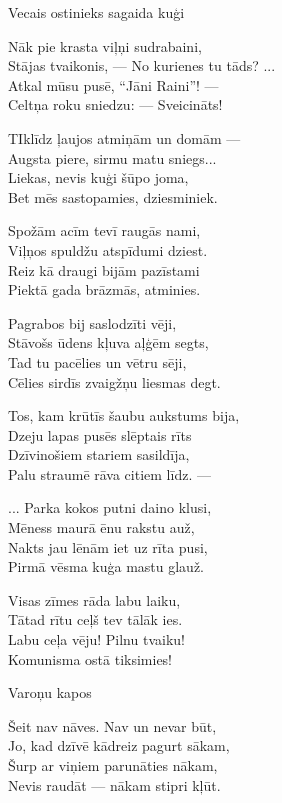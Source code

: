 \documentclass[14pt]{extarticle}
\begin{document}
{\newpage

{\large \sc Vecais ostinieks sagaida kuģi}

Nāk pie krasta viļņi sudrabaini,\\
Stājas tvaikonis, --- No kurienes tu tāds? ...\\
Atkal mūsu pusē, ``Jāni Raini''! ---\\
Celtņa roku sniedzu: --- Sveicināts!

TIklīdz ļaujos atmiņām un domām ---\\
Augsta piere, sirmu matu sniegs...\\
Liekas, nevis kuģi šūpo joma, \\
Bet mēs sastopamies, dziesminiek.

Spožām acīm tevī raugās nami,\\
Viļņos spuldžu atspīdumi dziest.\\
Reiz kā draugi bijām pazīstami\\
Piektā gada brāzmās, atminies.

Pagrabos bij saslodzīti vēji,\\
Stāvošs ūdens kļuva aļģēm segts,\\
Tad tu pacēlies un vētru sēji,\\
Cēlies sirdīs zvaigžņu liesmas degt.

Tos, kam krūtīs šaubu aukstums bija,\\
Dzeju lapas pusēs slēptais rīts\\
Dzīvinošiem stariem sasildīja,\\
Palu straumē rāva citiem līdz. ---

... Parka kokos putni daino klusi,\\
Mēness maurā ēnu rakstu auž,\\
Nakts jau lēnām iet uz rīta pusi,\\
Pirmā vēsma kuģa mastu glauž.

Visas zīmes rāda labu laiku,\\
Tātad rītu ceļš tev tālāk ies.\\
Labu ceļa vēju! Pilnu tvaiku!\\
Komunisma ostā tiksimies!

\newpage

{\large \sc Varoņu kapos}

Šeit nav nāves. Nav un nevar būt,\\
Jo, kad dzīvē kādreiz pagurt sākam,\\
Šurp ar viņiem parunāties nākam,\\
Nevis raudāt --- nākam stipri kļūt.

}
\end{document}

